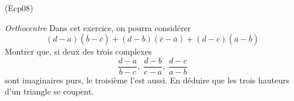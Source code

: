 \begin{tiny}(Ecp08)\end{tiny} \emph{Orthocentre}\newline
Dans cet exercice, on pourra consid{\'e}rer
\begin{displaymath}
 (d-a)(\overline{b}-\overline{c})+(d-b)(\overline{c}-\overline{a})+(d-c)(\overline{a}-\overline{b})
\end{displaymath}
Montrer que, si deux des trois complexes 
\begin{displaymath}
\frac{d-a}{b-c}, \;\frac{d-b}{c-a},\; \frac{d-c}{a-b} 
\end{displaymath}
sont imaginaires purs, le troisi{\`e}me l'est aussi. En d{\'e}duire que les trois hauteurs d'un triangle
se coupent.